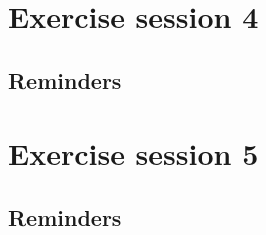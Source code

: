 \documentclass[pdfpagelabels=false, usepdftitle=false, aspectratio=169,10pt]{beamer}
\begin{document}
\section{Exercise session 4}
\subsection{Reminders}



\section{Exercise session 5}
\subsection{Reminders}












%
%
\end{document}
